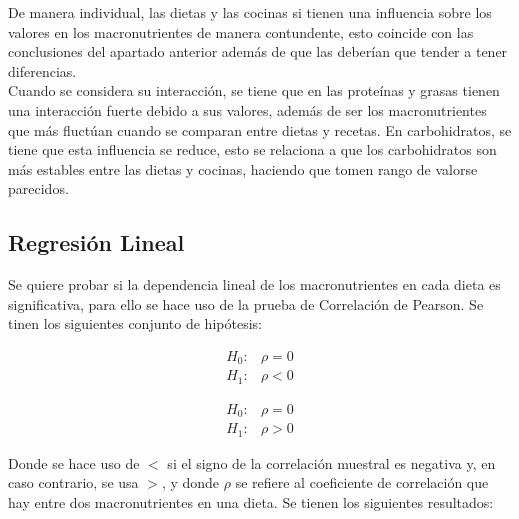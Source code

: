 \documentclass[12pt,a4paper]{article}
\begin{document}
{{            De manera individual, las dietas y las cocinas si tienen una influencia 
            sobre los valores en los macronutrientes de manera contundente, esto 
            coincide con las conclusiones del apartado anterior además de que las 
            deberían que tender a tener diferencias.\\
            
            Cuando se considera su interacción, 
            se tiene que en las proteínas y grasas tienen una interacción fuerte debido 
            a sus valores, además de ser los macronutrientes que más fluctúan cuando 
            se comparan entre dietas y recetas. En carbohidratos, se tiene que esta 
            influencia se reduce, esto se relaciona a que los carbohidratos son más 
            estables entre las dietas y cocinas, haciendo que tomen rango de valorse 
            parecidos.
        }

        \subsection{Regresión Lineal}
        {
            Se quiere probar si la dependencia lineal de los macronutrientes en cada 
            dieta es significativa, para ello se hace uso de la prueba de Correlación 
            de Pearson. Se tinen los siguientes conjunto de hipótesis:\\
            \begin{minipage}{0.5\textwidth}
                \begin{align*}
                    H_0 :& \rho = 0 \\
                    H_1 :& \rho < 0
                \end{align*}
            \end{minipage}%
            \begin{minipage}{0.5\textwidth}
                \begin{align*}
                    H_0 :& \rho = 0 \\
                    H_1 :& \rho > 0
                \end{align*}
            \end{minipage}

            Donde se hace uso de $<$ si el signo de la correlación muestral es negativa y, 
            en caso contrario, se usa $>$, y donde $\rho$ se refiere al coeficiente de correlación 
            que hay entre dos macronutrientes en una dieta. Se tienen los siguientes resultados:\\
            
}}
\end{document}
